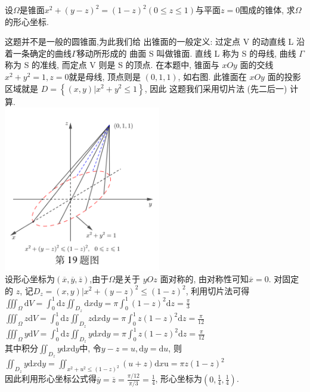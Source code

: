 \documentclass[kindlepaper]{BHCexam4kindle}
\begin{document}
\begin{questions}
		\qs 设$\Omega$是锥面$x^{2}+(y-z)^{2}=(1-z)^{2}(0 \leqslant z \leqslant 1)$与平面$z=0$围成的锥体, 求$\Omega$的形心坐标.
		\begin{solution}
			这题并不是一般的圆锥面,为此我们给
			出锥面的一般定义: 过定点 V 的动直线
			L 沿着一条确定的曲线$\Gamma$移动所形成的
			曲面 S 叫做锥面. 直线 L 称为 S 的母线,
			曲线 $\Gamma$称为 S 的准线, 而定点 V 则是 S
			的顶点. 在本题中, 锥面与 $xOy$ 面的交线
			$x^{2}+y^{2}=1, z=0$就是母线, 顶点则是
			$(0,1,1)$, 如右图. 此锥面在 $xOy$ 面的投影
			区域就是 $D=\left\{(x, y) | x^{2}+y^{2} \leqslant 1\right\}$, 因此
			这题我们采用切片法 (先二后一) 计算.\\
			\includegraphics[width=2.7in]{img-2019/2019-19} 
			\\
			设形心坐标为$(\overline{x}, \overline{y}, \overline{z})$,由于$\Omega$是关于 $yOz$ 面对称的, 由对称性可知$\overline{x}=0$. 
			对固定的 $z$, 记$D_{z}=(x, y) | x^{2}+(y-z)^{2} \leqslant(1-z)^{2}$, 利用切片法可得\\
			$\iiint_{\Omega} \mathrm{d} V=\int_{0}^{1} \mathrm{d} z \iint_{D_{z}} \mathrm{d} x \mathrm{d} y=\pi \int_{0}^{1}(1-z)^{2} \mathrm{d} z=\frac{\pi}{3}$
$\iiint_{\Omega} z \mathrm{d} V=\int_{0}^{1} \mathrm{d} z \iint_{D_{z}} z \mathrm{d} x \mathrm{d} y=\pi \int_{0}^{1} z(1-z)^{2} \mathrm{d} z=\frac{\pi}{12}$
$\iiint_{\Omega} y \mathrm{d} V=\int_{0}^{1} \mathrm{d} z \iint_{D_{z}} y \mathrm{d} x \mathrm{d} y=\pi \int_{0}^{1} z(1-z)^{2} \mathrm{d} z=\frac{\pi}{12}$
			\\其中积分$\iint_{D_{z}} y \mathrm{d} x \mathrm{d} y$中, 令$y-z=u, \mathrm{d} y=\mathrm{d} u$, 则\\
			$\iint_{D_{z}} y \mathrm{d} x \mathrm{d} y=\iint_{x^{2}+u^{2} \leqslant(1-z)^{2}}(u+z) \mathrm{d} x \mathrm{u}=\pi z(1-z)^{2}$\\
			因此利用形心坐标公式得$\overline{y}=\overline{z}=\frac{\pi / 12}{\pi / 3}=\frac{1}{4}$, 形心坐标为$\left(0, \frac{1}{4}, \frac{1}{4}\right)$.
		\end{solution}


\end{questions}
\end{document}
